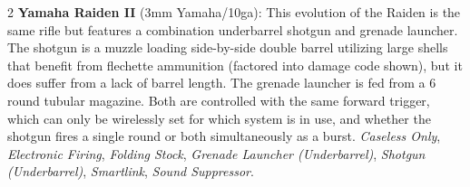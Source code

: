 \documentclass[
  oneside]{article}
\begin{document}
\begin{multicols}{2}
\textbf{Yamaha Raiden II} (3mm Yamaha/10ga): This
evolution of the Raiden is the same rifle but
features a combination underbarrel shotgun and
grenade launcher. The shotgun is a muzzle loading
side-by-side double barrel utilizing large shells
that benefit from flechette ammunition (factored
into damage code shown), but it does suffer from a
lack of barrel length. The grenade launcher is fed
from a 6 round tubular magazine. Both are
controlled with the same forward trigger, which
can only be wirelessly set for which system is in
use, and whether the shotgun fires a single round
or both simultaneously as a burst. \emph{Caseless
Only}, \emph{Electronic Firing}, \emph{Folding
Stock}, \emph{Grenade Launcher (Underbarrel)},
\emph{Shotgun (Underbarrel)}, \emph{Smartlink},
\emph{Sound Suppressor}.

\end{multicols}
\end{document}
